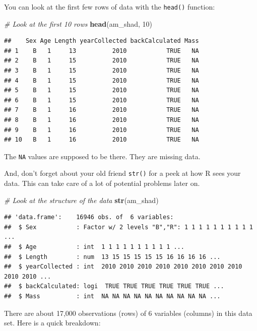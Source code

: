 \documentclass[
]{book}
\newenvironment{Shaded}{\begin{snugshade}}{\end{snugshade}}
\newcommand{\CommentTok}[1]{\textcolor[rgb]{0.56,0.35,0.01}{\textit{#1}}}
\newcommand{\DecValTok}[1]{\textcolor[rgb]{0.00,0.00,0.81}{#1}}
\newcommand{\KeywordTok}[1]{\textcolor[rgb]{0.13,0.29,0.53}{\textbf{#1}}}
\newcommand{\NormalTok}[1]{#1}
\begin{document}
You can look at the first few rows of data with the \texttt{head()} function:

\begin{Shaded}
\begin{Highlighting}[]
\CommentTok{# Look at the first 10 rows}
\KeywordTok{head}\NormalTok{(am_shad, }\DecValTok{10}\NormalTok{)}
\end{Highlighting}
\end{Shaded}

\begin{verbatim}
##    Sex Age Length yearCollected backCalculated Mass
## 1    B   1     13          2010           TRUE   NA
## 2    B   1     15          2010           TRUE   NA
## 3    B   1     15          2010           TRUE   NA
## 4    B   1     15          2010           TRUE   NA
## 5    B   1     15          2010           TRUE   NA
## 6    B   1     15          2010           TRUE   NA
## 7    B   1     16          2010           TRUE   NA
## 8    B   1     16          2010           TRUE   NA
## 9    B   1     16          2010           TRUE   NA
## 10   B   1     16          2010           TRUE   NA
\end{verbatim}

The \texttt{NA} values are supposed to be there. They are missing data.

And, don't forget about your old friend \texttt{str()} for a peek at how R sees your data. This can take care of a lot of potential problems later on.

\begin{Shaded}
\begin{Highlighting}[]
\CommentTok{# Look at the structure of the data}
\KeywordTok{str}\NormalTok{(am_shad)}
\end{Highlighting}
\end{Shaded}

\begin{verbatim}
## 'data.frame':	16946 obs. of  6 variables:
##  $ Sex           : Factor w/ 2 levels "B","R": 1 1 1 1 1 1 1 1 1 1 ...
##  $ Age           : int  1 1 1 1 1 1 1 1 1 1 ...
##  $ Length        : num  13 15 15 15 15 15 16 16 16 16 ...
##  $ yearCollected : int  2010 2010 2010 2010 2010 2010 2010 2010 2010 2010 ...
##  $ backCalculated: logi  TRUE TRUE TRUE TRUE TRUE TRUE ...
##  $ Mass          : int  NA NA NA NA NA NA NA NA NA NA ...
\end{verbatim}

There are about 17,000 observations (rows) of 6 variables (columns) in this data set. Here is a quick breakdown:
\end{document}
